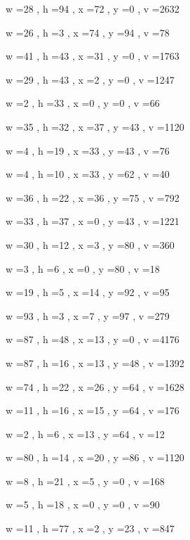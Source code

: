 \documentclass[11pt]{article}
\begin{document}
w =28 , h =94 , x =72 , y =0 , v =2632
\par
w =26 , h =3 , x =74 , y =94 , v =78
\par
w =41 , h =43 , x =31 , y =0 , v =1763
\par
w =29 , h =43 , x =2 , y =0 , v =1247
\par
w =2 , h =33 , x =0 , y =0 , v =66
\par
w =35 , h =32 , x =37 , y =43 , v =1120
\par
w =4 , h =19 , x =33 , y =43 , v =76
\par
w =4 , h =10 , x =33 , y =62 , v =40
\par
w =36 , h =22 , x =36 , y =75 , v =792
\par
w =33 , h =37 , x =0 , y =43 , v =1221
\par
w =30 , h =12 , x =3 , y =80 , v =360
\par
w =3 , h =6 , x =0 , y =80 , v =18
\par
w =19 , h =5 , x =14 , y =92 , v =95
\par
w =93 , h =3 , x =7 , y =97 , v =279
\par
\newpage




w =87 , h =48 , x =13 , y =0 , v =4176
\par
w =87 , h =16 , x =13 , y =48 , v =1392
\par
w =74 , h =22 , x =26 , y =64 , v =1628
\par
w =11 , h =16 , x =15 , y =64 , v =176
\par
w =2 , h =6 , x =13 , y =64 , v =12
\par
w =80 , h =14 , x =20 , y =86 , v =1120
\par
w =8 , h =21 , x =5 , y =0 , v =168
\par
w =5 , h =18 , x =0 , y =0 , v =90
\par
w =11 , h =77 , x =2 , y =23 , v =847
\par
\newpage
\end{document}
